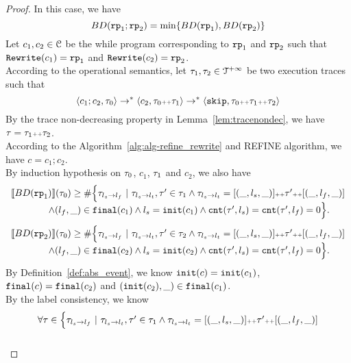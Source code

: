 \begin{proof}
In this case, we have
\[
  BD(\rprog_1; \rprog_2) = \min \left\{BD(\rprog_1), BD(\rprog_2) \right\}
\]
Let $c_1, c_2 \in \mathcal{C}$ be the while program corresponding to $\mathtt{rp}_1$ and $\mathtt{rp}_2$ such that $\mathtt{Rewrite}(c_1) = \mathtt{rp}_1$ and $\mathtt{Rewrite}(c_2) = \mathtt{rp}_2$.
\\
According to the operational semantics, let $\mathtt{\tau}_1, \mathtt{\tau}_2 \in \mathcal{T}^{+\infty}$ be two execution traces such that 
\[
  \langle c_1; c_2, \mathtt{\tau}_0 \rangle \to^* \langle c_2, \mathtt{\tau}_0 {\scriptscriptstyle ++} \mathtt{\tau}_1 \rangle \to^* \langle \mathtt{skip}, \mathtt{\tau}_0 {\scriptscriptstyle ++} \mathtt{\tau}_1 {\scriptscriptstyle ++} \mathtt{\tau}_2 \rangle
\]
By the trace non-decreasing property in Lemma~\ref{lem:tracenondec}, we have $\mathtt{\tau} = \mathtt{\tau}_1 {\scriptscriptstyle ++} \mathtt{\tau}_2$.
\\
According to the Algorithm~\ref{alg:alg-refine_rewrite} and REFINE algorithm, we have $c = c_1; c_2$.
\\
By induction hypothesis on $\mathtt{\tau}_0$, $c_1$, $\mathtt{\tau}_1$ and $c_2$, we also have
\[
  \begin{array}{l}
    \llbracket BD(\mathtt{rp}_1) \rrbracket(\mathtt{\tau}_0)
    \geq
    \# \Big\{\mathtt{\tau}_{l_s \to l_f} ~\vert~ \mathtt{\tau}_{l_s \to l_t}, \mathtt{\tau}' \in \mathtt{\tau}_1 \land \mathtt{\tau}_{l_s \to l_t} = [(\_, l_s, \_)] {\scriptscriptstyle ++} \mathtt{\tau}' {\scriptscriptstyle ++} [(\_, l_f, \_)]
    \\ \qquad \qquad
    \land (l_{f}, \_) \in \mathtt{final}(c_1)
    \land l_s = \mathtt{init}(c_1)
    \land \mathtt{cnt}(\mathtt{\tau}', l_s) = \mathtt{cnt}(\mathtt{\tau}', l_f) = 0 
    \Big\}.
    \end{array}
\]
%
\[
  \begin{array}{l}
    \llbracket BD(\mathtt{rp}_2) \rrbracket(\mathtt{\tau}_0)
    \geq
    \# \Big\{\mathtt{\tau}_{l_s \to l_f} ~\vert~ \mathtt{\tau}_{l_s \to l_t}, \mathtt{\tau}' \in \mathtt{\tau}_2 \land \mathtt{\tau}_{l_s \to l_t} = [(\_, l_s, \_)] {\scriptscriptstyle ++} \mathtt{\tau}' {\scriptscriptstyle ++} [(\_, l_f, \_)]
    \\ \qquad \qquad
    \land (l_{f}, \_) \in \mathtt{final}(c_2)
    \land l_s = \mathtt{init}(c_2)
    \land \mathtt{cnt}(\mathtt{\tau}', l_s) = \mathtt{cnt}(\mathtt{\tau}', l_f) = 0 
    \Big\}.
    \end{array}
\]
By Definition~\ref{def:abs_event}, we know
$\mathtt{init}(c) = \mathtt{init}(c_1)$, $\mathtt{final}(c) = \mathtt{final}(c_2)$ and $(\mathtt{init}(c_2), \_) \in \mathtt{final}(c_1)$. 
\\
By the label consistency, we know 
\[
  \begin{array}{l}
    \forall \mathtt{\tau} \in
    \Big\{\mathtt{\tau}_{l_s \to l_f} ~\vert~ \mathtt{\tau}_{l_s \to l_t}, \mathtt{\tau}' \in \mathtt{\tau}_1 \land \mathtt{\tau}_{l_s \to l_t} = [(\_, l_s, \_)] {\scriptscriptstyle ++} \mathtt{\tau}' {\scriptscriptstyle ++} [(\_, l_f, \_)]
    \\ \qquad \qquad

\end{array}\]
\end{proof}
